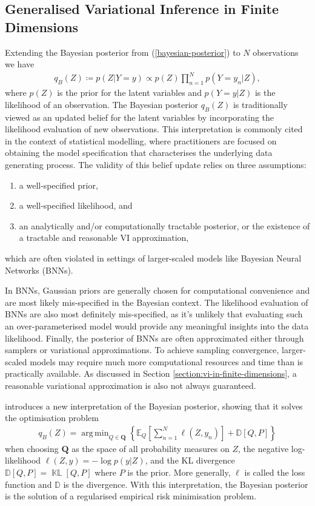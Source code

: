 \documentclass{article}
\newcommand{\KLD}{\operatorname{\mathbb{KL}}}
\DeclareMathOperator*{\argmin}{arg\,min}
\numberwithin{equation}{section}
\begin{document}
\subsection{Generalised Variational Inference in Finite Dimensions}
Extending the Bayesian posterior from (\ref{bayesian-posterior}) to $N$ observations we have
\begin{align}
    \label{bayesian-posterior-gvi}
    q_B(Z) \coloneqq p(Z\vert Y=y) \propto p(Z) \prod_{n=1}^N p(Y=y_n \vert Z),
\end{align}
where $p(Z)$ is the prior for the latent variables and $p(Y=y \vert Z)$ is the likelihood of an observation.
The Bayesian posterior $q_B(Z)$ is traditionally viewed as an updated belief for the latent variables by incorporating the likelihood evaluation of new observations.
This interpretation is commonly cited in the context of statistical modelling, where practitioners are focused on obtaining the model specification that characterises the underlying data generating process. 
The validity of this belief update relies on three assumptions:
\begin{enumerate}
    \setlength\itemsep{-0.25em}
    \item a well-specified prior,
    \item a well-specified likelihood, and
    \item an analytically and/or computationally tractable posterior, or the existence of a tractable and reasonable VI approximation,
\end{enumerate}
which are often violated in settings of larger-scaled models like Bayesian Neural Networks (BNNs).

In BNNs, Gaussian priors are generally chosen for computational convenience and are most likely mis-specified in the Bayesian context.
The likelihood evaluation of BNNs are also most definitely mis-specified, as it's unlikely that evaluating such an over-parameterised model would provide any meaningful insights into the data likelihood.
Finally, the posterior of BNNs are often approximated either through samplers or variational approximations.
To achieve sampling convergence, larger-scaled models may require much more computational resources and time than is practically available.
As discussed in Section \ref{section:vi-in-finite-dimensions}, a reasonable variational approximation is also not always guaranteed.

\cite{knoblauch2022optimization} introduces a new interpretation of the Bayesian posterior, showing that it solves the optimisation problem
\begin{align}
    q_B(Z) = \argmin_{Q \in \boldsymbol{Q}} \left\{\mathbb{E}_{Q}\left[\sum_{n=1}^N \ell \left(Z, y_n\right)\right] + \mathbb{D}\left[Q, P\right]\right\}
    \label{gvi-posterior}
\end{align}
when choosing $\boldsymbol{Q}$ as the space of all probability measures on $Z$, the negative log-likelihood $\ell(Z, y) =-\log p\left(y \vert Z\right)$,  and the KL divergence $\mathbb{D}\left[Q, P\right] = \KLD\left[Q, P\right]$ where $P$ is the prior.
More generally, $\ell$ is called the loss function and $\mathbb{D}$ is the divergence. With this interpretation, the Bayesian posterior is the solution of a regularised empirical risk minimisation problem.
\end{document}
